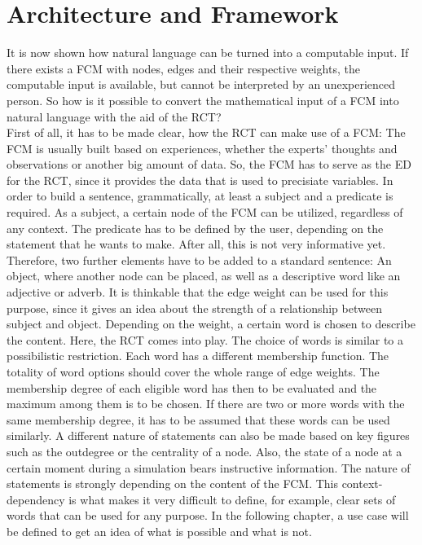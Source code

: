 \documentclass[conference]{IEEEtran}
\begin{document}
\section{Architecture and Framework}
It is now shown how natural language can be turned into a computable input. If there exists a FCM with nodes, edges and their respective weights, the computable input is available, but cannot be interpreted by an unexperienced person. So how is it possible to convert the mathematical input of a FCM into natural language with the aid of the RCT?\\
First of all, it has to be made clear, how the RCT can make use of a FCM: The FCM is usually built based on experiences, whether the experts' thoughts and observations or another big amount of data. So, the FCM has to serve as the ED for the RCT, since it provides the data that is used to precisiate variables.
In order to build a sentence, grammatically, at least a subject and a predicate is required. As a subject, a certain node of the FCM can be utilized, regardless of any context. The predicate has to be defined by the user, depending on the statement that he wants to make. After all, this is not very informative yet.
Therefore, two further elements have to be added to a standard sentence: An object, where another node can be placed, as well as a descriptive word like an adjective or adverb. It is thinkable that the edge weight can be used for this purpose, since it gives an idea about the strength of a relationship between subject and object. Depending on the weight, a certain word is chosen to describe the content.
Here, the RCT comes into play. The choice of words is similar to a possibilistic restriction. Each word has a different membership function. The totality of word options should cover the whole range of edge weights. The membership degree of each eligible word has then to be evaluated and the maximum among them is to be chosen. If there are two or more words with the same membership degree, it has to be assumed that these words can be used similarly.
A different nature of statements can also be made based on key figures such as the outdegree or the centrality of a node. Also, the state of a node at a certain moment during a simulation bears instructive information.
The nature of statements is strongly depending on the content of the FCM. This context-dependency is what makes it very difficult to define, for example, clear sets of words that can be used for any purpose. In the following chapter, a use case will be defined to get an idea of what is possible and what is not.
\end{document}
